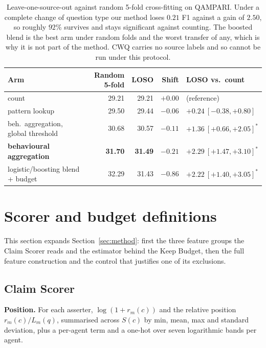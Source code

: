\documentclass{article}
\begin{document}
\begin{table}
  \caption{Leave-one-source-out against random 5-fold cross-fitting on QAMPARI. Under a complete change of question type our method loses $0.21$ F1 against a gain of $2.50$, so roughly $92\%$ survives and stays significant against counting. The boosted blend is the best arm under random folds and the worst transfer of any, which is why it is not part of the method. CWQ carries no source labels and so cannot be run under this protocol.}
  \label{tab:loso}
  \centering
  \begin{tabular}{lrrrl}
    \toprule
    Arm & Random 5-fold & LOSO & Shift & LOSO vs.\ count \\
    \midrule
    count                        & 29.21 & 29.21 & $+0.00$ & (reference) \\
    pattern lookup               & 29.50 & 29.44 & $-0.06$ & $+0.24\ [-0.38,+0.80]$ \\
    beh.\ aggregation, global threshold & 30.68 & 30.57 & $-0.11$ & $+1.36\ [+0.66,+2.05]^*$ \\
    \textbf{behavioural aggregation} & \textbf{31.70} & \textbf{31.49} & $\mathbf{-0.21}$ & $\mathbf{+2.29\ [+1.47,+3.10]^*}$ \\
    logistic/boosting blend + budget & 32.29 & 31.43 & $-0.86$ & $+2.22\ [+1.40,+3.05]^*$ \\
    \bottomrule
  \end{tabular}
\end{table}

\section{Scorer and budget definitions}
\label{app:features}

This section expands Section~\ref{sec:method}: first the three feature groups the Claim
Scorer reads and the estimator behind the Keep Budget, then the full feature construction
and the control that justifies one of its exclusions.

\subsection{Claim Scorer}

\textbf{Position.} For each asserter, $\log(1 + r_m(c))$ and the relative position
$r_m(c)/L_m(q)$, summarised across $S(c)$ by min, mean, max and standard deviation, plus
a per-agent term and a one-hot over seven logarithmic bands per agent.
\end{document}

